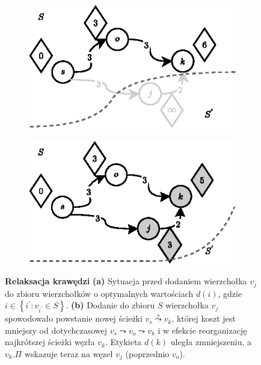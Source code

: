 \begin{figure}[!htbp]
	\centering
	\begin{subfigure}[b]{0.45\textwidth}
		\includegraphics[width=\textwidth]{Chapter_I/9/1_9a.eps}
		\caption{}
		\label{fig:relaxEdges:a}
	\end{subfigure}%
	\qquad
	\begin{subfigure}[b]{0.45\textwidth}
		\includegraphics[width=\textwidth]{Chapter_I/9/1_9b.eps}
		\caption{}
		\label{fig:relaxEdges:b}
	\end{subfigure}
	\caption{\textbf{Relaksacja krawędzi} \textbf{(a)} Sytuacja przed dodaniem wierzchołka $v_{j}$ do zbioru wierzchołków o optymalnych wartościach $d \left( i \right) $, gdzie $i \in \left\{ i^{'} : v_{i^{'}} \in S \right\} $. \textbf{(b)} Dodanie do zbioru $S$ wierzchołka $v_{j}$ spowodowało powstanie nowej ścieżki $v_{s} \overset{*}\leadsto v_{k}$, której koszt jest mniejszy od dotychczasowej $v_{s} \leadsto v_{o} \leadsto v_{k}$ i w efekcie reorganizację najkrótszej ścieżki węzła $v_{k}$. Etykieta $ d \left( k \right)$ uległa zmniejszeniu, a $v_{k}.\Pi$ wskazuje teraz na węzeł $v_{j}$ (poprzednio $v_{o}$).}\label{fig:relaxEdges}
\end{figure}

